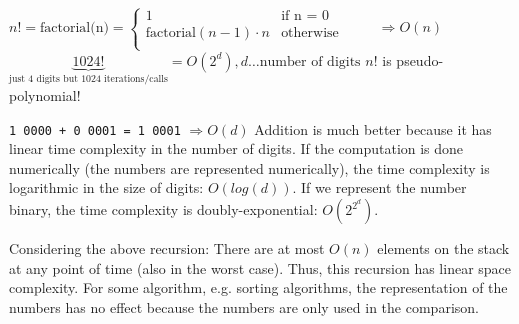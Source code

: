 


\par{
	\noindent
	$n! = \text{factorial(n)} = \begin{cases}
		1 								&	\text{if n = 0}		\\
		\text{factorial}(n-1) \cdot n 	&	\text{otherwise}	\\
	\end{cases}
	\hspace{1cm}\Rightarrow O(n)$ \newline\newline
	$\underbrace{1024!}_{\text{just 4 digits but 1024 iterations/calls}} = O(2^d), d \ldots \text{number of digits}$ \newline\newline
	$n!$ is pseudo-polynomial!
}

\par{
	\noindent
	\texttt{1 0000 + 0 0001 = 1 0001} $\Rightarrow O(d)$ \newline
	Addition is much better because it has linear time complexity in the number of digits. If the computation is done numerically (the numbers are represented numerically), the time complexity is logarithmic in the size of digits: $O(log(d))$. \newline
	If we represent the number binary, the time complexity is doubly-exponential: $O\left(2^{2^d}\right)$.
}

\par{
	\noindent
	Considering the above recursion: There are at most $O(n)$ elements on the stack at any point of time (also in the worst case). Thus, this recursion has linear space complexity. \newline
	For some algorithm, e.g. sorting algorithms, the representation of the numbers has no effect because the numbers are only used in the comparison.
}

